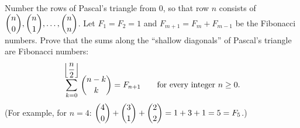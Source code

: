 Number the rows of Pascal's triangle from $0$, so that row $n$ consists of $\dbinom n0,\dbinom n1,\dots,\dbinom nn$. Let $F_1=F_2=1$ and $F_{m+1}=F_m+F_{m-1}$ be the Fibonacci numbers. Prove that the sums along the ``shallow diagonals'' of Pascal's triangle are Fibonacci numbers:
\[\sum_{k=0}^{\left\lfloor\dfrac n2\right\rfloor}\dbinom{n-k}{k}=F_{n+1}\qquad\text{for every integer }n\ge0.\]
(For example, for $n=4$: $\dbinom40+\dbinom31+\dbinom22=1+3+1=5=F_5$.)
